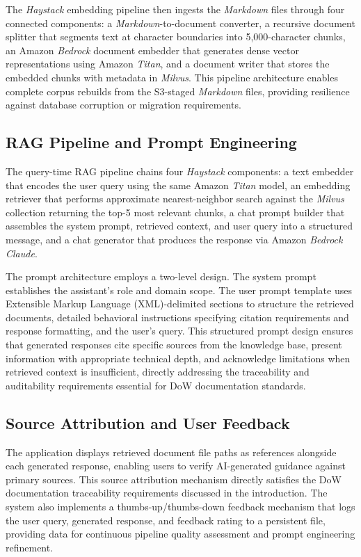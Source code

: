 \documentclass[12pt,letterpaper]{article}
\begin{document}
The \textit{Haystack} embedding pipeline then ingests the \textit{Markdown} files through four connected components: a \textit{Markdown}-to-document converter, a recursive document splitter that segments text at character boundaries into 5,000-character chunks, an Amazon \textit{Bedrock} document embedder that generates dense vector representations using Amazon \textit{Titan}, and a document writer that stores the embedded chunks with metadata in \textit{Milvus}. This pipeline architecture enables complete corpus rebuilds from the S3-staged \textit{Markdown} files, providing resilience against database corruption or migration requirements.

\subsection{RAG Pipeline and Prompt Engineering}

The query-time RAG pipeline chains four \textit{Haystack} components: a text embedder that encodes the user query using the same Amazon \textit{Titan} model, an embedding retriever that performs approximate nearest-neighbor search against the \textit{Milvus} collection returning the top-5 most relevant chunks, a chat prompt builder that assembles the system prompt, retrieved context, and user query into a structured message, and a chat generator that produces the response via Amazon \textit{Bedrock Claude}.

The prompt architecture employs a two-level design. The system prompt establishes the assistant's role and domain scope. The user prompt template uses Extensible Markup Language (XML)-delimited sections to structure the retrieved documents, detailed behavioral instructions specifying citation requirements and response formatting, and the user's query. This structured prompt design ensures that generated responses cite specific sources from the knowledge base, present information with appropriate technical depth, and acknowledge limitations when retrieved context is insufficient, directly addressing the traceability and auditability requirements essential for DoW documentation standards.

\subsection{Source Attribution and User Feedback}

The application displays retrieved document file paths as references alongside each generated response, enabling users to verify AI-generated guidance against primary sources. This source attribution mechanism directly satisfies the DoW documentation traceability requirements discussed in the introduction. The system also implements a thumbs-up/thumbs-down feedback mechanism that logs the user query, generated response, and feedback rating to a persistent file, providing data for continuous pipeline quality assessment and prompt engineering refinement.
\end{document}
